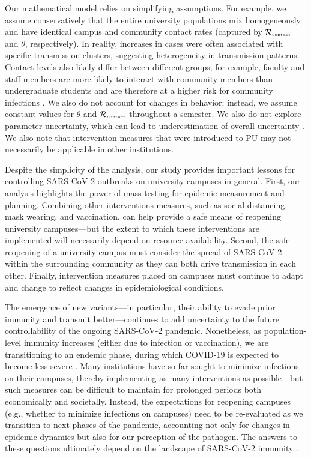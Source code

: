 \documentclass[12pt]{article}
\newcommand{\Rx}[1]{\ensuremath{{\mathcal R}_{#1}}}
\newcommand{\Rc}{\Rx{\textrm{\tiny{contact}}}}
\begin{document}
Our mathematical model relies on simplifying assumptions.
For example, we assume conservatively that the entire university populations mix homogeneously and have identical campus and community contact rates (captured by $\Rc$ and $\theta$, respectively).
In reality, increases in cases were often associated with specific transmission clusters, suggesting heterogeneity in transmission patterns.
Contact levels also likely differ between different groups;
for example, faculty and staff members are more likely to interact with community members than undergraduate students and are therefore at a higher risk for community infections \citep{frazier2022modeling}.
We also do not account for changes in behavior; 
instead, we assume constant values for $\theta$ and $\Rc$ throughout a semester.
We also do not explore parameter uncertainty, which can lead to underestimation of overall uncertainty \citep{elderd2006uncertainty}. 
We also note that intervention measures that were introduced to PU may not necessarily be applicable in other institutions.

Despite the simplicity of the analysis, our study provides important lessons for controlling SARS-CoV-2 outbreaks on university campuses in general.
First, our analysis highlights the power of mass testing for epidemic measurement and planning.
Combining other interventions measures, such as social distancing, mask wearing, and vaccination, can help provide a safe means of reopening university campuses---but the extent to which these interventions are implemented will necessarily depend on resource availability.
Second, the safe reopening of a university campus must consider the spread of SARS-CoV-2 within the surrounding community as they can both drive transmission in each other.
Finally, intervention measures placed on campuses must continue to adapt and change to reflect changes in epidemiological conditions.

The emergence of new variants---in particular, their ability to evade prior immunity and transmit better---continues to add uncertainty to the future controllability of the ongoing SARS-CoV-2 pandemic.
Nonetheless, as population-level immunity increases (either due to infection or vaccination), we are transitioning to an endemic phase, during which COVID-19 is expected to become less severe \citep{lavine2021immunological}.
Many institutions have so far sought to minimize infections on their campuses, thereby implementing as many interventions as possible---but such measures can be difficult to maintain for prolonged periods both economically and societally.
Instead, the expectations for reopening campuses (e.g., whether to minimize infections on campuses) need to be re-evaluated as we transition to next phases of the pandemic, accounting not only for changes in epidemic dynamics but also for our perception of the pathogen.
The answers to these questions ultimately depend on the landscape of SARS-CoV-2 immunity \citep{saad2020immune,baker2021limits}.
\end{document}
